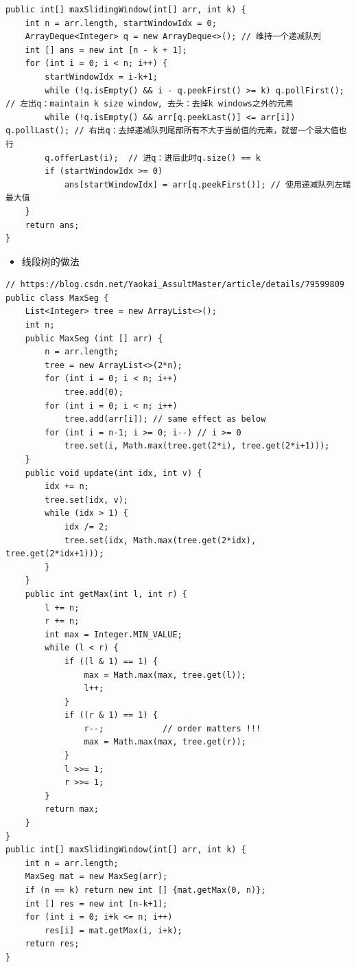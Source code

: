 \documentclass[9pt, b5paper]{article}
\begin{document}
\begin{verbatim}
public int[] maxSlidingWindow(int[] arr, int k) {
    int n = arr.length, startWindowIdx = 0;
    ArrayDeque<Integer> q = new ArrayDeque<>(); // 维持一个递减队列
    int [] ans = new int [n - k + 1];
    for (int i = 0; i < n; i++) {
        startWindowIdx = i-k+1;
        while (!q.isEmpty() && i - q.peekFirst() >= k) q.pollFirst();     // 左出q：maintain k size window, 去头：去掉k windows之外的元素
        while (!q.isEmpty() && arr[q.peekLast()] <= arr[i]) q.pollLast(); // 右出q：去掉递减队列尾部所有不大于当前值的元素，就留一个最大值也行
        q.offerLast(i);  // 进q：进后此时q.size() == k 
        if (startWindowIdx >= 0)
            ans[startWindowIdx] = arr[q.peekFirst()]; // 使用递减队列左端最大值
    }
    return ans;
}
\end{verbatim}
\begin{itemize}
\item 线段树的做法
\end{itemize}
\begin{verbatim}
// https://blog.csdn.net/Yaokai_AssultMaster/article/details/79599809
public class MaxSeg {
    List<Integer> tree = new ArrayList<>();
    int n;
    public MaxSeg (int [] arr) {
        n = arr.length;
        tree = new ArrayList<>(2*n);
        for (int i = 0; i < n; i++) 
            tree.add(0);
        for (int i = 0; i < n; i++) 
            tree.add(arr[i]); // same effect as below
        for (int i = n-1; i >= 0; i--) // i >= 0
            tree.set(i, Math.max(tree.get(2*i), tree.get(2*i+1)));
    }
    public void update(int idx, int v) {
        idx += n;
        tree.set(idx, v);
        while (idx > 1) {
            idx /= 2;
            tree.set(idx, Math.max(tree.get(2*idx), tree.get(2*idx+1)));
        }
    }
    public int getMax(int l, int r) {
        l += n;
        r += n;
        int max = Integer.MIN_VALUE;
        while (l < r) {
            if ((l & 1) == 1) {
                max = Math.max(max, tree.get(l));
                l++;
            }
            if ((r & 1) == 1) {
                r--;            // order matters !!!
                max = Math.max(max, tree.get(r));
            }
            l >>= 1;
            r >>= 1;
        }
        return max;
    }
}
public int[] maxSlidingWindow(int[] arr, int k) {
    int n = arr.length;
    MaxSeg mat = new MaxSeg(arr);
    if (n == k) return new int [] {mat.getMax(0, n)};
    int [] res = new int [n-k+1];
    for (int i = 0; i+k <= n; i++) 
        res[i] = mat.getMax(i, i+k);
    return res;
}
\end{verbatim}
\end{document}
